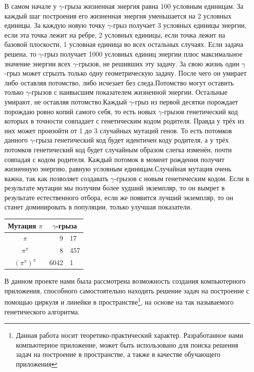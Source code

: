 \documentclass[a4paper,12pt]{article}
\theoremstyle{plain} %
\numberwithin{equation}{section}
\theoremstyle{definition} %
\theoremstyle{remark} %
\begin{document}
В самом начале у $\gamma$-грыза жизненная энергия равна 100 условным единицам. За каждый шаг построения его жизненная энергия уменьшается на 2 условных единицы.  За каждую новую точку $\gamma$-грыз получает 3 условных единицы энергии, если эта точка лежит на ребре, 2 условных единицы, если точка лежит на базовой плоскости, 1 условная единица во всех остальных случаях. Если задача решена, то $\gamma$-грыз получает 1000 условных единиц энергии плюс максимальное значение энергии всех $\gamma$-грызов, не решивших эту задачу. За свою жизнь один $\gamma$-грыз может сгрызть только одну геометрическую задачу. После чего он умирает либо оставляя потомство, либо исчезает без следа.Потомство могут оставить только $\gamma$-грызов с наивысшим показателем жизненной энергии. Остальные  умирают, не оставляя потомство.Каждый $\gamma$-грыз из первой десятки порождает порождаю ровно  копий самого себя, то есть  новых $\gamma$-грызов генетический код которых в точности совпадает с генетическим кодом родителя. Правда у трёх из них может произойти от 1 до 3 случайных мутаций генов. То есть  потомков данного $\gamma$-грыза генетический код будет идентичен коду родителя, а у трёх потомков генетический код будет случайным образом слегка изменён, почти совпадая с кодом родителя. Каждый потомок в момент рождения получит жизненную энергию, равную  условным единицам.Случайная мутация очень важна, так как позволяет создавать $\gamma$-грызов с новым генетическим кодом. Если в результате мутации мы получим более худший экземпляр, то он вымрет в результате естественного отбора, если же появится лучший экземпляр, то он станет доминировать в популяции, только улучшая показатели.
\newpage
\begin{tabular}{c r @{.} l}
Мутация $\pi$       &
\multicolumn{2}{c}{$\gamma$-грыза} \\
\hline
$\pi$               & 9&17  \\
$\pi^{\pi}$         & 8&457   \\
$(\pi^{\pi})^{\pi}$ & 6042&1 \\
\end{tabular}
В данном проекте нами была рассмотрена возможность создания компьютерного приложения\cite{BibEntry2022Jul}, способного самостоятельно находить решение задач на построение с помощью циркуля и линейки в пространстве\footnote{Данная работа носит теоретико-практический характер. Разработанное нами компьютерное приложение, может быть использовано для поиска решения  задач на построение в пространстве, а также в качестве обучающего приложения}, на основе на так называемого генетического алгоритма.


\end{document}
